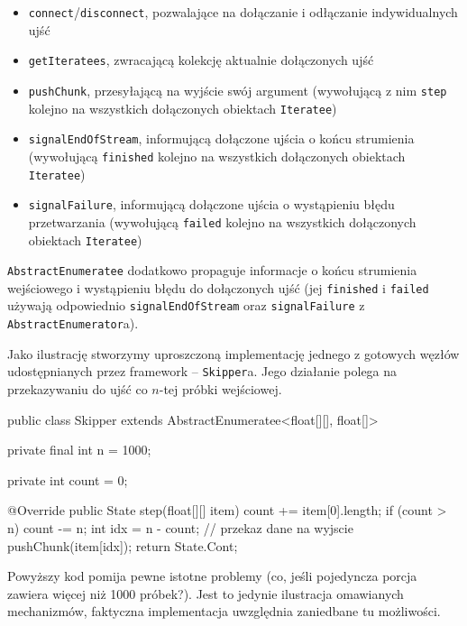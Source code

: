 \begin{itemize}

  \item \texttt{connect}/\texttt{disconnect}, pozwalające na dołączanie i odłączanie indywidualnych
    ujść

  \item \texttt{getIteratees}, zwracającą kolekcję aktualnie dołączonych ujść

  \item \texttt{pushChunk}, przesyłającą na wyjście swój argument (wywołującą z nim \texttt{step}
    kolejno na wszystkich dołączonych obiektach \texttt{Iteratee})

  \item \texttt{signalEndOfStream}, informującą dołączone ujścia o końcu strumienia (wywołującą
    \texttt{finished} kolejno na wszystkich dołączonych obiektach \texttt{Iteratee})

  \item \texttt{signalFailure}, informującą dołączone ujścia o wystąpieniu błędu przetwarzania
    (wywołującą \texttt{failed} kolejno na wszystkich dołączonych obiektach \texttt{Iteratee})

\end{itemize}

\texttt{AbstractEnumeratee} dodatkowo propaguje informacje o końcu strumienia wejściowego i
wystąpieniu błędu do dołączonych ujść (jej \texttt{finished} i \texttt{failed} używają odpowiednio
\texttt{signalEndOfStream} oraz \texttt{signalFailure} z \texttt{AbstractEnumerator}a).

Jako ilustrację stworzymy uproszczoną implementację jednego z gotowych węzłów udostępnianych przez
framework -- \texttt{Skipper}a. Jego działanie polega na przekazywaniu do ujść co $n$-tej próbki
wejściowej.

\begin{java}
public class Skipper extends AbstractEnumeratee<float[][], float[]> {

    private final int n = 1000;

    private int count = 0;

    @Override
    public State step(float[][] item) {
        count += item[0].length;
        if (count > n) {
            count -= n;
            int idx = n - count;
            // przekaz dane na wyjscie
            pushChunk(item[idx]);
        }
        return State.Cont;
    }
}
\end{java}

\begin{Note}
Powyższy kod pomija pewne istotne problemy (co, jeśli pojedyncza porcja zawiera więcej niż 1000
próbek?). Jest to jedynie ilustracja omawianych mechanizmów, faktyczna implementacja uwzględnia
zaniedbane tu możliwości.
\end{Note}


